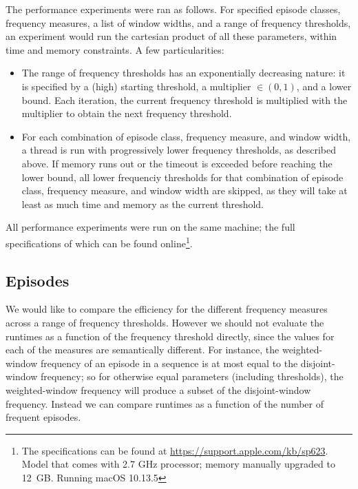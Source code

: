 The performance experiments were ran as follows. For specified episode classes, frequency measures, a list of window widths, and a range of frequency thresholds, an experiment would run the cartesian product of all these parameters, within time and memory constraints. A few particularities:

\begin{itemize}
\item The range of frequency thresholds has an exponentially decreasing nature: it is specified by a (high) starting threshold, a multiplier $ \in (0, 1) $, and a lower bound. Each iteration, the current frequency threshold is multiplied with the multiplier to obtain the next frequency threshold.
\item For each combination of episode class, frequency measure, and window width, a thread is run with progressively lower frequency thresholds, as described above. If memory runs out or the timeout is exceeded before reaching the lower bound, all lower frequenciy thresholds for that combination of episode class, frequency measure, and window width are skipped, as they will take at least as much time and memory as the current threshold.
\end{itemize}

All performance experiments were run on the same machine; the full specifications of which can be found online\footnote{The specifications can be found at \url{https://support.apple.com/kb/sp623}. Model that comes with 2.7 GHz processor; memory manually upgraded to 12~GB. Running macOS 10.13.5}.


\subsection{Episodes}

We would like to compare the efficiency for the different frequency measures across a range of frequency thresholds. However we should not evaluate the runtimes as a function of the frequency threshold directly, since the values for each of the measures are semantically different. For instance, the weighted-window frequency of an episode in a sequence is at most equal to the disjoint-window frequency; so for otherwise equal parameters (including thresholds), the weighted-window frequency will produce a subset of the disjoint-window frequency. Instead we can compare runtimes as a function of the number of frequent episodes.

